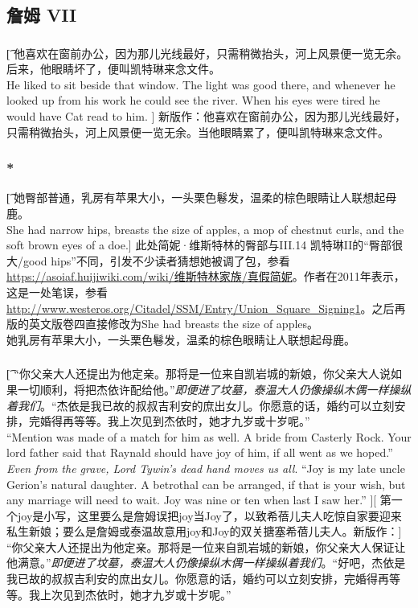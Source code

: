 \documentclass[12pt,a4paper]{article}
\begin{document}
\subsection{詹姆 VII}

\subsubsection{}\t[
	他喜欢在窗前办公，因为那儿光线最好，只需稍微抬头，河上风景便一览无余。后来，他眼睛坏了，便叫凯特琳来念文件。\\
	He liked to sit beside that window. The light was good there, and whenever he looked up from his work he could see the river. When his eyes were tired he would have Cat read to him. ]
	新版作：他喜欢在窗前办公，因为那儿光线最好，只需稍微抬头，河上风景便一览无余。当他眼睛累了，便叫凯特琳来念文件。
	
\subsubsection{\color{red}*}\t[
	她臀部普通，乳房有苹果大小，一头栗色鬈发，温柔的棕色眼睛让人联想起母鹿。\\
	She had narrow hips, breasts the size of apples, a mop of chestnut curls, and the soft brown eyes of a doe.]
	\color{red}此处简妮·维斯特林的臀部与III.14 凯特琳II的“臀部很大/good hips”不同，引发不少读者猜想她被调了包，参看\href{https://asoiaf.huijiwiki.com/wiki/%E7%BB%B4%E6%96%AF%E7%89%B9%E6%9E%97%E5%AE%B6%E6%97%8F/%E7%9C%9F%E5%81%87%E7%AE%80%E5%A6%AE}{https://asoiaf.huijiwiki.com/wiki/维斯特林家族/真假简妮}。作者在2011年表示，这是一处笔误，参看\url{http://www.westeros.org/Citadel/SSM/Entry/Union_Square_Signing1}。之后再版的英文版卷四直接修改为She had breasts the size of apples。
	\color{black}\\
	她乳房有苹果大小，一头栗色鬈发，温柔的棕色眼睛让人联想起母鹿。	
	
\subsubsection{}\t[
	“你父亲大人还提出为他定亲。那将是一位来自凯岩城的新娘，你父亲大人说如果一切顺利，将把杰依许配给他。”\emph{即便进了坟墓，泰温大人仍像操纵木偶一样操纵着我们}。“杰依是我已故的叔叔吉利安的庶出女儿。你愿意的话，婚约可以立刻安排，完婚得再等等。我上次见到杰依时，她才九岁或十岁呢。”\\ 
	“Mention was made of a match for him as well. A bride from Casterly Rock. Your lord father said that Raynald should have joy of him, if all went as we hoped.” \emph{Even from the grave, Lord Tywin's dead hand moves us all}. “Joy is my late uncle Gerion's natural daughter. A betrothal can be arranged, if that is your wish, but any marriage will need to wait. Joy was nine or ten when last I saw her.” ][
	第一个joy是小写，这里要么是詹姆误把joy当Joy了，以致希蓓儿夫人吃惊自家要迎来私生新娘；要么是詹姆或泰温故意用joy和Joy的双关搪塞希蓓儿夫人。新版作：]
	“你父亲大人还提出为他定亲。那将是一位来自凯岩城的新娘，你父亲大人保证让他满意。”\emph{即便进了坟墓，泰温大人仍像操纵木偶一样操纵着我们}。“好吧，杰依是我已故的叔叔吉利安的庶出女儿。你愿意的话，婚约可以立刻安排，完婚得再等等。我上次见到杰依时，她才九岁或十岁呢。”
	
\end{document}
